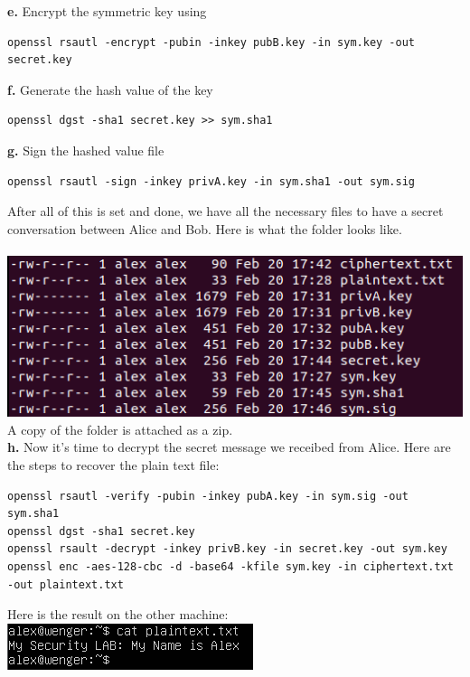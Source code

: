 \documentclass[12pt]{extarticle}
\begin{document}
\textbf{e.} Encrypt the symmetric key using
\begin{verbatim}
openssl rsautl -encrypt -pubin -inkey pubB.key -in sym.key -out secret.key
\end{verbatim}

\textbf{f.} Generate the hash value of the key
\begin{verbatim}
openssl dgst -sha1 secret.key >> sym.sha1
\end{verbatim}

\textbf{g.} Sign the hashed value file
\begin{verbatim}
openssl rsautl -sign -inkey privA.key -in sym.sha1 -out sym.sig
\end{verbatim}

After all of this is set and done, we have all the necessary files to have a secret conversation between Alice and Bob. Here is what the folder looks like.\\\\
\includegraphics[scale=0.6]{resources/3.png}
A copy of the folder is attached as a zip.\\

\textbf{h.} Now it's time to decrypt the secret message we receibed from Alice. Here are the steps to recover the plain text file:
\begin{verbatim}
openssl rsautl -verify -pubin -inkey pubA.key -in sym.sig -out sym.sha1
openssl dgst -sha1 secret.key
openssl rsault -decrypt -inkey privB.key -in secret.key -out sym.key
openssl enc -aes-128-cbc -d -base64 -kfile sym.key -in ciphertext.txt -out plaintext.txt
\end{verbatim}
Here is the result on the other machine:
\includegraphics[scale=0.6]{resources/4.png}
\end{document}
